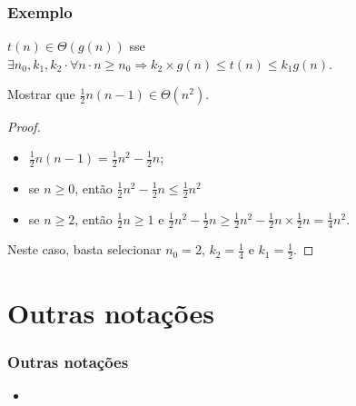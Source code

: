 \documentclass{beamer}
\begin{document}
\begin{frame}
\frametitle{Exemplo}

\begin{definition}
$t(n) \in \Theta(g(n))$ sse $\exists n_0, k_1, k_2 \cdot \forall n \cdot n \ge n_0 \Rightarrow k_2 \times g(n) \le t(n) \le k_1 g(n)$.
\end{definition}

\begin{example}
Mostrar que $\frac{1}{2} n (n-1) \in \Theta(n^2)$.
\end{example}

\begin{proof}
  \begin{itemize}
    \item $\frac{1}{2} n (n-1) = \frac{1}{2}n^2 - \frac{1}{2}n$;
    \item se $n \ge 0$, então $\frac{1}{2}n^2 - \frac{1}{2}n \le \frac{1}{2}n^2$
    \item se $n \ge 2$, então $\frac{1}{2}n \ge 1$ e $\frac{1}{2}n^2 - \frac{1}{2}n \ge \frac{1}{2}n^2 - \frac{1}{2}n \times \frac{1}{2}n = \frac{1}{4}n^2$.
  \end{itemize}
  Neste caso, basta selecionar $n_0 = 2$, $k_2 = \frac{1}{4}$ 
  e $k_1 = \frac{1}{2}$.
\end{proof}
\end{frame}

\section{Outras notações}

\begin{frame}
\frametitle{Outras notações}

\begin{itemize}
\item 
{}
\pause
{}
\pause
{}
\end{itemize}

\end{frame}
\end{document}
